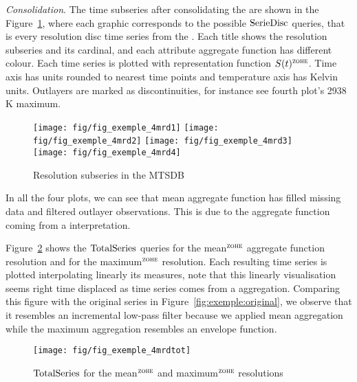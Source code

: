 \emph{Consolidation}. The time subseries after consolidating the
 are shown in the Figure~\ref{fig:exemple:4mrd}, where
each graphic corresponds to the possible $\operatorname{SerieDisc}$ queries, that is
every resolution disc time series from the . Each title
shows the resolution subseries and its cardinal, and each attribute
aggregate function has different colour.  Each time series is plotted
with \zohe{} representation function $S(t)^\zohe{}$. Time axis has
 units rounded to nearest time points and temperature axis
has Kelvin units. Outlayers are marked as discontinuities, for
instance see fourth plot's 2938 K maximum.

\begin{figure}[tp]
  \centering
  \texttt{[image: fig/fig\_exemple\_4mrd1]}
  \texttt{[image: fig/fig\_exemple\_4mrd2]}
  \texttt{[image: fig/fig\_exemple\_4mrd3]}
  \texttt{[image: fig/fig\_exemple\_4mrd4]}
  \caption{Resolution subseries in the MTSDB}
  \label{fig:exemple:4mrd}
\end{figure}

In all the four plots, we can see that mean aggregate function has
filled missing data and filtered outlayer observations. This is due
to the aggregate function coming from a \zohe{} interpretation.

Figure~\ref{fig:exemple:4mrdtot} shows the $\operatorname{TotalSeries}$
queries for the mean$^{\zohe}$ aggregate function resolution and for
the maximum$^{\zohe}$ resolution.  Each resulting time series is
plotted interpolating linearly its measures, note that this linearly
visualisation seems right time displaced as time series comes from a
\zohe{} aggregation.  Comparing this figure with the original series
in Figure~\ref{fig:exemple:original}, we observe that it resembles an
incremental low-pass filter because we applied mean aggregation while
the maximum aggregation resembles an envelope function.

\begin{figure}[tp]
  \centering
  \texttt{[image: fig/fig\_exemple\_4mrdtot]}
  \caption{$\operatorname{TotalSeries}$ for the mean$^{\zohe}$ and maximum$^{\zohe}$
    resolutions}
  \label{fig:exemple:4mrdtot}
\end{figure}


